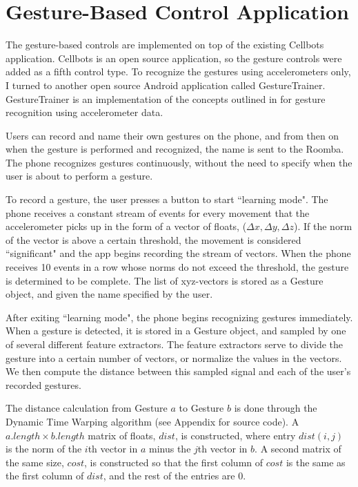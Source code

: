\documentclass[12pt,a4paper]{report}
\begin{document}
\section{Gesture-Based Control Application}
The gesture-based controls are implemented on top of the existing Cellbots application. Cellbots is an open source application, so the gesture controls were added as a fifth control type. 
To recognize the gestures using accelerometers only, I turned to another open source Android application called GestureTrainer. GestureTrainer is an implementation of the concepts outlined in \cite{TaKG} for gesture recognition using accelerometer data.

Users can record and name their own gestures on the phone, and from then on when the gesture is performed and recognized, the name is sent to the Roomba. The phone recognizes gestures continuously, without the need to specify when the user is about to perform a gesture.

To record a gesture, the user presses a button to start ``learning mode". The phone receives a constant stream of events for every movement that the accelerometer picks up in the form of a vector of floats, ($\Delta x, \Delta y, \Delta z$). If the norm of the vector is above a certain threshold, the movement is considered ``significant" and the app begins recording the stream of vectors. When the phone receives 10 events in a row whose norms do not exceed the threshold, the gesture is determined to be complete. The list of xyz-vectors is stored as a Gesture object, and given the name specified by the user. 

After exiting ``learning mode", the phone begins recognizing gestures immediately. When a gesture is detected, it is stored in a Gesture object, and sampled by one of several different feature extractors. The feature extractors serve to divide the gesture into a certain number of vectors, or normalize the values in the vectors. We then compute the distance between this sampled signal and each of the user's recorded gestures.

The distance calculation from Gesture $a$ to Gesture $b$ is done through the Dynamic Time Warping algorithm (see Appendix for source code). A $a.length \times b.length$ matrix of floats, $dist$, is constructed, where entry $dist(i,j)$ is the norm of the $i$th vector in $a$ minus the $j$th vector in $b$. A second matrix of the same size, $cost$, is constructed so that the first column of $cost$ is the same as the first column of $dist$, and the rest of the entries are 0.
\end{document}
